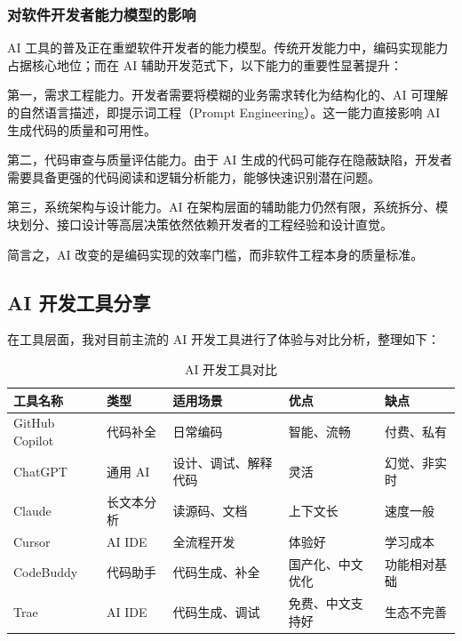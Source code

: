 \documentclass[12pt,a4paper]{article}
\begin{document}
\subsubsection{对软件开发者能力模型的影响}

AI 工具的普及正在重塑软件开发者的能力模型。传统开发能力中，编码实现能力占据核心地位；而在 AI 辅助开发范式下，以下能力的重要性显著提升：

第一，需求工程能力。开发者需要将模糊的业务需求转化为结构化的、AI 可理解的自然语言描述，即提示词工程（Prompt Engineering）。这一能力直接影响 AI 生成代码的质量和可用性。

第二，代码审查与质量评估能力。由于 AI 生成的代码可能存在隐蔽缺陷，开发者需要具备更强的代码阅读和逻辑分析能力，能够快速识别潜在问题。

第三，系统架构与设计能力。AI 在架构层面的辅助能力仍然有限，系统拆分、模块划分、接口设计等高层决策依然依赖开发者的工程经验和设计直觉。

简言之，AI 改变的是编码实现的效率门槛，而非软件工程本身的质量标准。

\subsection{AI 开发工具分享}

在工具层面，我对目前主流的 AI 开发工具进行了体验与对比分析，整理如下：

\begin{table}[htbp]
\centering
\caption{AI 开发工具对比}
\label{tab:tools}
\renewcommand{\arraystretch}{1.3}
\begin{tabularx}{\textwidth}{>{\centering\arraybackslash}m{2.2cm}>{\centering\arraybackslash}m{1.8cm}>{\centering\arraybackslash}m{2.8cm}>{\centering\arraybackslash}m{3cm}>{\centering\arraybackslash}m{3cm}}
\toprule
\textbf{工具名称} & \textbf{类型} & \textbf{适用场景} & \textbf{优点} & \textbf{缺点} \\
\midrule
GitHub Copilot & 代码补全 & 日常编码 & 智能、流畅 & 付费、私有 \\
ChatGPT & 通用 AI & 设计、调试、解释代码 & 灵活 & 幻觉、非实时 \\
Claude & 长文本分析 & 读源码、文档 & 上下文长 & 速度一般 \\
Cursor & AI IDE & 全流程开发 & 体验好 & 学习成本 \\
CodeBuddy & 代码助手 & 代码生成、补全 & 国产化、中文优化 & 功能相对基础 \\
Trae & AI IDE & 代码生成、调试 & 免费、中文支持好 & 生态不完善 \\
\bottomrule
\end{tabularx}
\end{table}
\end{document}
